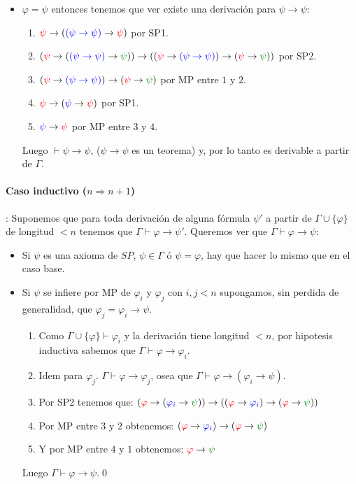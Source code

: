 	\begin{demoPart}[]
		\begin{itemize}
		\item $\varphi = \psi$ entonces tenemos que ver existe una derivación para $\psi\rightarrow\psi$:
		\begin{enumerate}
			\item ${\color{red}\psi}\rightarrow({\color{blue}(\psi\to\psi)}\rightarrow {\color{red}\psi})$ por SP1.
			\item $\spdos{\psi}{(\psi\to\psi)}{\psi}$ por SP2.
			\item $(\red{\psi}\to\blue{(\psi\to\psi)})\to(\red{\psi}\to\green{\psi})$ por MP entre $1$ y $2$.
			\item ${\color{red}\psi}\rightarrow({\color{blue}\psi}\rightarrow {\color{red}\psi})$ por SP1.
			\item ${\color{blue}\psi}\to{\color{red}\psi}$ por MP entre $3$ y $4$.
		\end{enumerate}
	Luego $\vdash \psi\to\psi$, ($\psi\to\psi$ es un teorema) y, por lo tanto es derivable a partir de  $\Gamma$.
	\end{itemize}

\paragraph{Caso inductivo ($n\Rightarrow n+1$)}: Suponemos que para toda derivación de alguna fórmula $\psi'$ a partir de $\Gamma\cup\{\varphi\}$ de longitud $< n$ tenemos que $\Gamma\vdash\varphi\to\psi'$. Queremos ver que $\Gamma\vdash\varphi\to\psi$:

\begin{itemize}
	\item Si $\psi$ es una axioma de $SP$, $\psi\in\Gamma$ ó $\psi = \varphi$, hay que hacer lo mismo que en el caso base.
	\item Si $\psi$ se infiere por MP de $\varphi_i$ y $\varphi_j$ con $i,j < n$ supongamos, sin perdida de generalidad, que $\varphi_j = \varphi_i\to\psi$.
	\begin{enumerate}
		\item Como $\Gamma\cup\{\varphi\}\vdash\varphi_i$ y la derivación tiene longitud $ < n$, por hipotesis inductiva sabemos que $\Gamma\vdash\varphi\to\varphi_i$. 
		\item Idem para $\varphi_j$. $\Gamma\vdash\varphi\to\varphi_j$, osea que $\Gamma\vdash\varphi\to(\varphi_i\to\psi)$.
		\item Por SP2 tenemos que: $\spdos{\varphi}{\varphi_i}{\psi}$	
		
		\item Por MP entre $3$ y $2$ obtenemos: $(\red{\varphi}\to\blue{\varphi_i})\to(\red{\varphi}\to\green{\psi})$
		
		\item Y por MP entre $4$ y $1$ obtenemos: 
		$\red{\varphi}\to\green{\psi}$
	\end{enumerate}
Luego $\Gamma\vdash\varphi\to\psi$.\qed
\end{itemize}
\end{demoPart}

